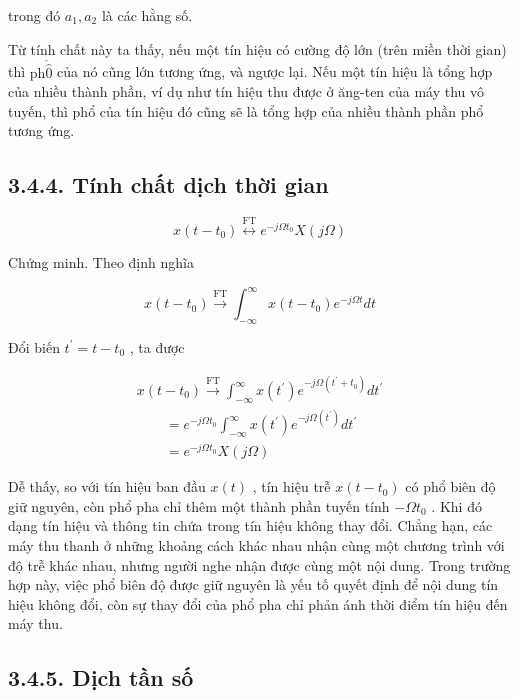 \documentclass[
  10
]{article}
\begin{document}
trong đó \(a _ { 1 } , a _ { 2 }\) là các hằng số.

Từ tính chất này ta thấy, nếu một tín hiệu có cường độ lớn (trên miền
thời gian) thì \(\mathrm { p h } \mathring { \hat { 0 } }\) của nó cũng
lớn tương ứng, và ngược lại. Nếu một tín hiệu là tổng hợp của nhiều
thành phần, ví dụ như tín hiệu thu được ở ăng-ten của máy thu vô tuyến,
thì phổ của tín hiệu đó cũng sẽ là tổng hợp của nhiều thành phần phổ
tương ứng.

\subsection{3.4.4. Tính chất dịch thời
gian}\label{tuxednh-chux1ea5t-dux1ecbch-thux1eddi-gian}

\[
x (t - t _ {0}) \stackrel {\mathrm{FT}} {\longleftrightarrow} e ^ {- j \Omega t _ {0}} X (j \Omega)
\]

Chứng minh. Theo định nghĩa

\[
x (t - t _ {0}) \xrightarrow {\mathrm{FT}} \int_ {- \infty} ^ {\infty} x (t - t _ {0}) e ^ {- j \Omega t} d t
\]

Đổi biến \(t ^ { \prime } = t - t _ { 0 }\) , ta được

\[
\begin{array}{l} x (t - t _ {0}) \xrightarrow {\mathrm{FT}} \int_ {- \infty} ^ {\infty} x (t ^ {\prime}) e ^ {- j \Omega (t ^ {\prime} + t _ {0})} d t ^ {\prime} \\ \qquad = e ^ {- j \Omega t _ {0}} \int_ {- \infty} ^ {\infty} x (t ^ {\prime}) e ^ {- j \Omega (t ^ {\prime})} d t ^ {\prime} \\ \qquad = e ^ {- j \Omega t _ {0}} X (j \Omega) \end{array}
\]

Dễ thấy, so với tín hiệu ban đầu \(x ( t )\) , tín hiệu trễ
\(x ( t - t _ { 0 } )\) có phổ biên độ giữ nguyên, còn phổ pha chỉ thêm
một thành phần tuyến tính \(- \Omega t _ { 0 }\) . Khi đó dạng tín hiệu
và thông tin chứa trong tín hiệu không thay đổi. Chẳng hạn, các máy thu
thanh ở những khoảng cách khác nhau nhận cùng một chương trình với độ
trễ khác nhau, nhưng người nghe nhận được cùng một nội dung. Trong
trường hợp này, việc phổ biên độ được giữ nguyên là yếu tố quyết định để
nội dung tín hiệu không đổi, còn sự thay đổi của phổ pha chỉ phản ánh
thời điểm tín hiệu đến máy thu.

\subsection{3.4.5. Dịch tần số}\label{dux1ecbch-tux1ea7n-sux1ed1}
\end{document}

